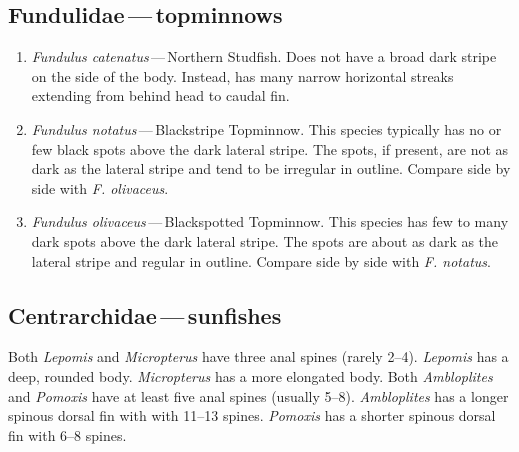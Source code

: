 \documentclass[11pt]{article}
\begin{document}
\subsection*{Fundulidae\,—\,topminnows}

\begin{enumerate}
	\item\textit{Fundulus catenatus}\,—\,Northern Studfish. Does not have a broad dark stripe on the side of the body. Instead, has many narrow horizontal streaks extending from behind head to caudal fin.

	\item\textit{Fundulus notatus}\,—\,Blackstripe Topminnow. This species typically has no or few black spots above the dark lateral stripe. The spots, if present, are not as dark as the lateral stripe and tend to be irregular in outline. Compare side by side with \textit{F. olivaceus}. 

	\item\textit{Fundulus olivaceus}\,—\,Blackspotted Topminnow. This species has few to many dark spots above the dark lateral stripe. The spots are about as dark as the lateral stripe and regular in outline. Compare side by side with \textit{F. notatus}. 
\end{enumerate}

\subsection*{Centrarchidae\,—\,sunfishes}

Both \textit{Lepomis} and \textit{Micropterus} have three anal spines (rarely 2–4). \textit{Lepomis} has a deep, rounded body. \textit{Micropterus} has a more elongated body.  Both \textit{Ambloplites} and \textit{Pomoxis} have at least five anal spines (usually 5–8). \textit{Ambloplites} has a longer spinous dorsal fin with with 11–13 spines. \textit{Pomoxis} has a shorter spinous dorsal fin with 6–8 spines.
\end{document}
